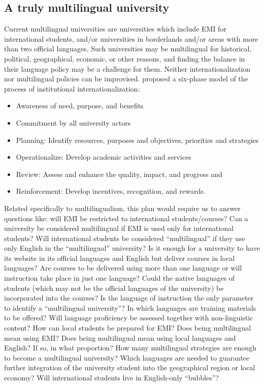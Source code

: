 \documentclass[output=paper]{langscibook}
\begin{document}
\subsection{A truly multilingual university}

Current multilingual universities are universities which include EMI for international students, and/or universities in borderlands and/or areas with more than two official languages. Such universities may be multilingual for historical, political, geographical, economic, or other reasons, and finding the balance in their language policy may be a challenge for them. Neither internationalization nor multilingual policies can be improvised.  \citet[12]{Knight1994} proposed a six-phase model of the process of institutional internationalization: 

\begin{itemize}
\item Awareness of need, purpose, and benefits 
\item Commitment by all university actors 
\item Planning: Identify resources, purposes and objectives, priorities and strategies 
\item Operationalize: Develop academic activities and services 
\item Review: Assess and enhance the quality, impact, and progress and 
\item Reinforcement: Develop incentives, recognition, and rewards.
\end{itemize}

Related specifically to multilingualism, this plan would require us to answer questions like: will EMI be restricted to international students/courses? Can a university be considered multilingual if EMI is used only for international students? Will international students be considered “multilingual” if they use only English in the “multilingual” university? Is it enough for a university to have its website in its official languages and English but deliver courses in local languages? Are courses to be delivered using more than one language or will instruction take place in just one language? Could the native languages of students (which may not be the official languages of the university) be incorporated into the courses? Is the language of instruction the only parameter to identify a “multilingual university”? In which languages are training materials to be offered? Will language proficiency be assessed together with non-linguistic content? How can local students be prepared for EMI? Does being multilingual mean using EMI? Does being multilingual mean using local languages and English? If so, in what proportion? How many multilingual strategies are enough to become a multilingual university? Which languages are needed to guarantee further integration of the university student into the geographical region or local economy? Will international students live in English-only “bubbles”?
\end{document}
